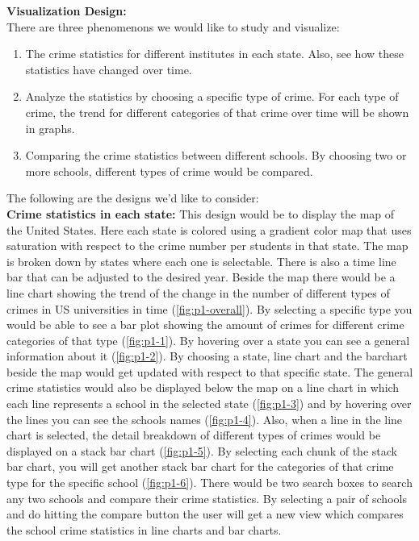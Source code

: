 \documentclass[12pt]{article}
\begin{document}
\noindent
\textbf{Visualization Design:}\\
There are three phenomenons we would like to study and visualize:
\begin{enumerate}
\item The crime statistics for different institutes in each state. Also, see how these statistics have changed over time.
\item Analyze the statistics by choosing a specific type of crime. For each type of crime, the trend for different categories of that crime over time will be shown in graphs.
\item Comparing the crime statistics between different schools. By choosing two or more schools, different types of crime would be compared.
\end{enumerate}
The following are the designs we'd like to consider:\\

\noindent	
\textbf{Crime statistics in each state:} This design would be to display the map of the United States. Here each state is colored using a gradient color map that uses saturation with respect to the crime number per students in that state. The map is broken down by states where each one is selectable. There is also a time line bar that can be adjusted to the desired year. Beside the map there would be a line chart showing the trend of the change in the number of different types of crimes in US universities in time (\cref{fig:p1-overall}). By selecting a specific type you would be able to see a bar plot showing the amount of crimes for different crime categories of that type (\cref{fig:p1-1}). By hovering over a state you can see a general information about it (\cref{fig:p1-2}). By choosing a state, line chart and the barchart beside the map would get updated with respect to that specific state. The general crime statistics would also be displayed below the map on a line chart in which each line represents a school in the selected state (\cref{fig:p1-3}) and by hovering over the lines you can see the schools names (\cref{fig:p1-4}). Also, when a line in the line chart is selected, the detail breakdown of different types of crimes would be displayed on a stack bar chart (\cref{fig:p1-5}). By selecting each chunk of the stack bar chart, you will get another stack bar chart for the categories of that crime type for the specific school (\cref{fig:p1-6}). There would be two search boxes to search any two schools and compare their crime statistics. By selecting a pair of schools and do hitting the compare button the user will get a new view which compares the school crime statistics in line charts and bar charts.
\\
\end{document}
